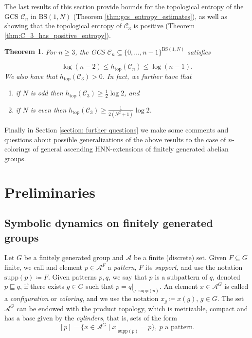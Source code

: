 \documentclass[cupthm,crop,info]{CUP-JNL-ETS}%
\theoremstyle{cupplain}
\newtheorem{theorem}{Theorem}[section]
\theoremstyle{cupdefinition}
\theoremstyle{cupremark}
\theoremstyle{cupproof}
\numberwithin{equation}{section}
\newcommand{\BS}[1][N]{\mathrm{BS}(1,#1)}
\def\htop{h_{\mathrm{top}}}
\begin{document}
The last results of this section provide bounds for the topological entropy of the GCS $\mathcal{C}_n$ in $\BS$ (Theorem \ref{thm:gcs_entropy_estimates}), as well as showing that the topological entropy of $\mathcal{C}_3$ is positive (Theorem \ref{thm:C_3_has_positive_entropy}).
\begin{theorem} \label{thm:summary_gcs_entropy}
	For $n\ge 3$, the GCS $\mathcal{C}_n\subseteq\{0,\ldots,n-1\}^{\BS}$ satisfies

	$$
	\log(n-2)\le\htop(\mathcal{C}_n)\le\log(n-1).
	$$
	We also have that $\htop(\mathcal{C}_3)>0$. In fact, we further have that
	\begin{enumerate}
		\item if $N$ is odd then $\htop(\mathcal{C}_3)\ge\frac{1}{2}\log 2$, and
		\item if $N$ is even then $\htop(\mathcal{C}_3)\ge\frac{1}{2(N^2+1)}\log 2$.
	\end{enumerate}
\end{theorem}

Finally in Section \ref{section: further questions} we make some comments and questions about possible generalizations of the above results to the case of $n$-colorings of general ascending HNN-extensions of finitely generated abelian groups.




\section{Preliminaries}\label{section:preliminaries}

\subsection{Symbolic dynamics on finitely generated groups}
Let $G$ be a finitely generated group and $\mathcal{A}$ be a finite (discrete) set. Given $F\subseteq G$ finite, we call and element $p\in \mathcal{A}^{F}$ a \textit{pattern}, $F$ its \textit{support}, and use the notation $\mathrm{supp}(p)\coloneqq F$. Given patterns $p,q$, we say that $p$ is a subpattern of $q$, denoted $p\sqsubseteq q$, if there exists $g\in G$ such that $p=q|_{g\cdot \mathrm{supp}(p)}$. An element $x\in \mathcal{A}^G$ is called a \textit{configuration} or \textit{coloring}, and we use the notation $x_g\coloneqq x(g)$, $g\in G$. The set $\mathcal{A}^G$ can be endowed with the product topology, which is metrizable, compact and has a base given by the \textit{cylinders}, that is, sets of the form
$$
[p]=\{x\in \mathcal{A}^G\mid x|_{\mathrm{supp}(p)}=p \}, \ p\text{ a pattern}.
$$ 
\end{document}
